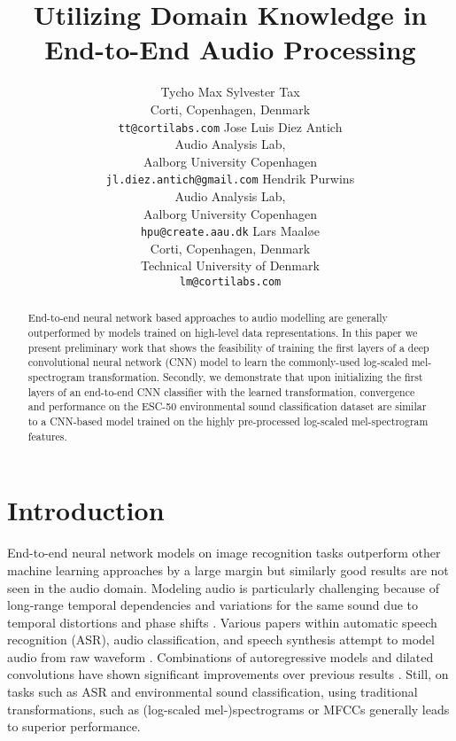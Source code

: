 \documentclass{article}
\title{Utilizing Domain Knowledge in End-to-End Audio Processing}
\author{
Tycho Max Sylvester Tax\\
Corti, Copenhagen, Denmark\\
\texttt{tt@cortilabs.com}
\And
Jose Luis Diez Antich\\
Audio Analysis Lab,\\
Aalborg University Copenhagen\\
\texttt{jl.diez.antich@gmail.com}
\And
Hendrik Purwins \\
Audio Analysis Lab,\\
Aalborg University Copenhagen\\
\texttt{hpu@create.aau.dk}
\And
Lars Maaløe\\
Corti, Copenhagen, Denmark\\
Technical University of Denmark\\
\texttt{lm@cortilabs.com}
}
\begin{document}

\maketitle


\begin{abstract}

End-to-end neural network based approaches to audio modelling are generally outperformed by models trained on high-level data representations. In this paper we present preliminary work that shows the feasibility of training the first layers of a deep convolutional neural network (CNN) model to learn the commonly-used log-scaled mel-spectrogram transformation. Secondly, we demonstrate that upon initializing the first layers of an end-to-end CNN classifier with the learned transformation, convergence and performance on the ESC-50 environmental sound classification dataset are similar to a CNN-based model trained on the highly pre-processed log-scaled mel-spectrogram features.

\end{abstract}

\section{Introduction}
End-to-end neural network models on image recognition tasks outperform other machine learning approaches by a large margin \cite{NIPS2012_4824} but similarly good results are not seen in the audio domain. Modeling audio is particularly challenging because of long-range temporal dependencies \cite{dieleman2016wavenet} and variations for the same sound due to temporal distortions and phase shifts \cite{ghahremani2016acoustic}. Various papers within automatic speech recognition (ASR), audio classification, and speech synthesis attempt to model audio from raw waveform \cite{dieleman2014end}\cite{dieleman2016wavenet}\cite{hoshen_speech_2015}\cite{collobert2016wav2letter}. Combinations of autoregressive models and dilated convolutions have shown significant improvements over previous results \cite{dieleman2016wavenet}. Still, on tasks such as ASR and environmental sound classification, using traditional transformations, such as (log-scaled mel-)spectrograms or MFCCs generally leads to superior performance.
\end{document}

